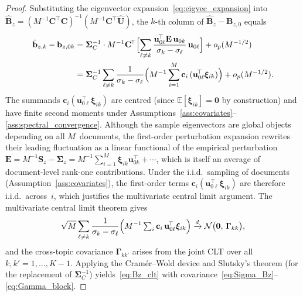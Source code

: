 \begin{proof}
Substituting the eigenvector
expansion~\eqref{eq:eigvec_expansion} into
$\hat{\mathbf{B}}_z = (M^{-1}\mathbf{C}^{\!\top}\mathbf{C})^{-1}
(M^{-1}\mathbf{C}^{\!\top}\hat{\mathbf{U}})$, the $k$-th column of
$\hat{\mathbf{B}}_z - \mathbf{B}_{z,0}$ equals
\begin{align}
  \hat{\mathbf{b}}_{z,k} - \mathbf{b}_{z,0k}
  &= \boldsymbol{\Sigma}_C^{-1}
     \cdot M^{-1}\mathbf{C}^{\!\top}
     \Bigl[
       \sum_{\ell\neq k}
       \frac{\mathbf{u}_{0\ell}^{\!\top}\mathbf{E}\,\mathbf{u}_{0k}}
            {\sigma_k - \sigma_\ell}\,\mathbf{u}_{0\ell}
     \Bigr]
     + o_p(M^{-1/2}) \notag\\
  &= \boldsymbol{\Sigma}_C^{-1}
     \sum_{\ell\neq k}
     \frac{1}{\sigma_k - \sigma_\ell}
     \Bigl(
       M^{-1}\sum_{i=1}^M
       \mathbf{c}_i\,
       (\mathbf{u}_{0\ell}^{\!\top}\boldsymbol{\xi}_{ik})
     \Bigr)
     + o_p(M^{-1/2}).
  \label{eq:Bz_expansion}
\end{align}
The summands
$\mathbf{c}_i(\mathbf{u}_{0\ell}^{\!\top}\boldsymbol{\xi}_{ik})$
are centred (since $\mathbb{E}[\boldsymbol{\xi}_{ik}]=\mathbf{0}$
by construction) and have finite
second moments under
Assumptions~\ref{ass:covariates}--\ref{ass:spectral_convergence}.
Although the sample eigenvectors are global objects depending on all
$M$~documents, the first-order perturbation expansion rewrites their
leading fluctuation as a linear functional of the empirical perturbation
$\mathbf{E} = M^{-1}\mathbf{S}_z - \boldsymbol{\Sigma}_z
 = M^{-1}\sum_{i=1}^M \boldsymbol{\xi}_{ik}\mathbf{u}_{0k}^{\!\top}
   + \cdots$,
which is itself an average of document-level rank-one contributions.
Under the i.i.d.\ sampling of documents
(Assumption~\ref{ass:covariates}), the first-order terms
$\mathbf{c}_i(\mathbf{u}_{0\ell}^{\!\top}\boldsymbol{\xi}_{ik})$ are
therefore i.i.d.\ across~$i$, which justifies the multivariate central
limit argument.
The multivariate central limit theorem gives
\[
  \sqrt{M}\sum_{\ell\neq k}
  \frac{1}{\sigma_k-\sigma_\ell}
  \Bigl(
    M^{-1}\textstyle\sum_i
    \mathbf{c}_i\,\mathbf{u}_{0\ell}^{\!\top}\boldsymbol{\xi}_{ik}
  \Bigr)
  \xrightarrow{d}
  \mathcal{N}\bigl(\mathbf{0},\,
    \boldsymbol{\Gamma}_{kk}\bigr),
\]
and the cross-topic covariance $\boldsymbol{\Gamma}_{kk'}$ arises from
the joint CLT over all $k,k'=1,\dots,K{-}1$.
Applying the Cram\'er--Wold device and Slutsky's theorem (for the
replacement of $\boldsymbol{\Sigma}_C^{-1}$) yields~\eqref{eq:Bz_clt}
with covariance~\eqref{eq:Sigma_Bz}--\eqref{eq:Gamma_block}.
\end{proof}

